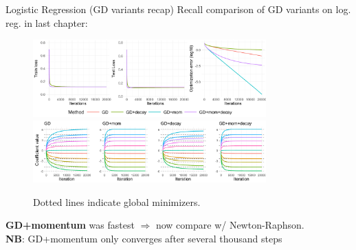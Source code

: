 \documentclass[11pt,compress,t,notes=noshow, xcolor=table]{beamer}
\begin{document}
\begin{vbframe}{Logistic Regression (GD variants recap)}
\vspace{-0.3cm}
Recall comparison of GD variants on log. reg. in last chapter:
\begin{figure}
            \includegraphics[width=0.8\textwidth]{slides/04-multivariate-first-order/figure_man/simu_linmod/GD_log_med_lr_iters.pdf} \\
             \includegraphics[width=0.8\textwidth]{slides/04-multivariate-first-order/figure_man/simu_linmod/GD_log_coef_med.pdf}\\
            \begin{footnotesize}
            Dotted lines indicate global minimizers.
            \end{footnotesize}
\end{figure}
\vspace{-0.2cm}
\textbf{GD+momentum} was fastest $\Rightarrow$ now compare w/ Newton-Raphson.\\
\textbf{NB}: GD+momentum only converges after several thousand steps
\end{vbframe}
\end{document}
